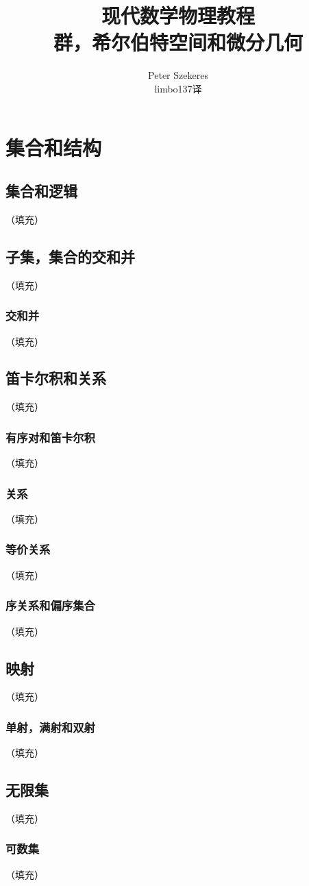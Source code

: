 \documentclass[hyperref,UTF8]{ctexbook}
\title{现代数学物理教程\\群，希尔伯特空间和微分几何}
\author{Peter Szekeres\\limbo137译}
\date{}
\begin{document}
\maketitle
\tableofcontents
\chapter{集合和结构}
\section{集合和逻辑}
（填充）
\section{子集，集合的交和并}
（填充）
\subsection{交和并}
（填充）
\section{笛卡尔积和关系}
（填充）
\subsection{有序对和笛卡尔积}
（填充）
\subsection{关系}
（填充）
\subsection{等价关系}
（填充）
\subsection{序关系和偏序集合}
（填充）
\section{映射}
（填充）
\subsection{单射，满射和双射}
（填充）
\section{无限集}
（填充）
\subsection{可数集}（填充）
\end{document}
